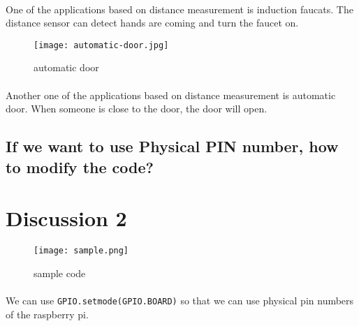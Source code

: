 \paragraph{}
One of the applications based on distance measurement is induction faucats. The distance sensor can detect hands are coming and turn the faucet on.
\begin{figure}[!h]
\begin{center} 
\texttt{[image: automatic-door.jpg]} 
\caption{automatic door}
\end{center} 
\end{figure} 
\paragraph{}
Another one of the applications based on distance measurement is automatic door. When someone is close to the door, the door will open.
\subsection{If we want to use Physical PIN number, how to modify the code?}
\section{Discussion 2}
\begin{figure}[!h]
\begin{center} 
\texttt{[image: sample.png]} 
\caption{sample code}
\end{center} 
\end{figure} 
\paragraph{}
We can use \texttt{GPIO.setmode(GPIO.BOARD)} so that we can use physical pin numbers of the raspberry pi.

